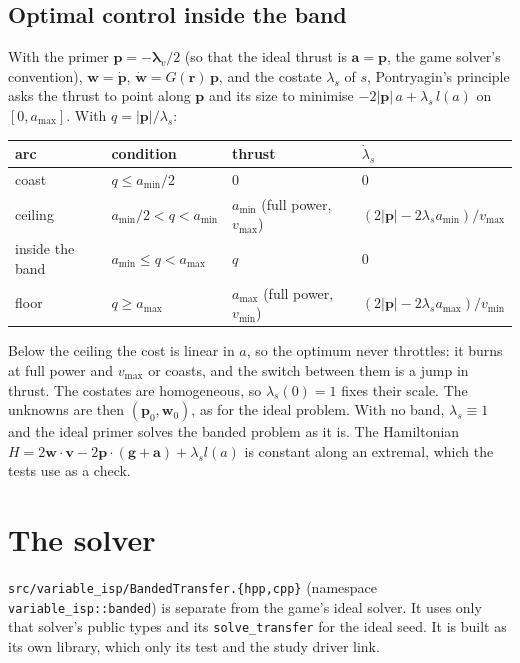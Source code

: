 \documentclass[10pt,a4paper]{article}
\begin{document}
\subsection{Optimal control inside the band}

With the primer $\mathbf p = -\boldsymbol\lambda_v/2$ (so that the ideal thrust is $\mathbf a = \mathbf p$, the game
solver's convention), $\mathbf w = \dot{\mathbf p}$, $\dot{\mathbf w} = G(\mathbf r)\,\mathbf p$, and the costate
$\lambda_s$ of $s$, Pontryagin's principle asks the thrust to point along $\mathbf p$ and its size to minimise
$-2|\mathbf p|\,a + \lambda_s\,l(a)$ on $[0, a_{\max}]$. With $q = |\mathbf p|/\lambda_s$:

\begin{center}
\begin{tabular}{llll}\toprule
arc & condition & thrust & $\dot\lambda_s$ \\ \midrule
coast & $q \le a_{\min}/2$ & $0$ & $0$ \\
ceiling & $a_{\min}/2 < q < a_{\min}$ & $a_{\min}$ (full power, $v_{\max}$) & $(2|\mathbf p| - 2\lambda_s a_{\min})/v_{\max}$ \\
inside the band & $a_{\min} \le q < a_{\max}$ & $q$ & $0$ \\
floor & $q \ge a_{\max}$ & $a_{\max}$ (full power, $v_{\min}$) & $(2|\mathbf p| - 2\lambda_s a_{\max})/v_{\min}$ \\
\bottomrule\end{tabular}
\end{center}

Below the ceiling the cost is linear in $a$, so the optimum never throttles: it burns at full power and $v_{\max}$
or coasts, and the switch between them is a jump in thrust. The costates are homogeneous, so $\lambda_s(0) = 1$
fixes their scale. The unknowns are then $(\mathbf p_0, \mathbf w_0)$, as for the ideal problem. With no band,
$\lambda_s \equiv 1$ and the ideal primer solves the banded problem as it is. The Hamiltonian
$H = 2\mathbf w\cdot\mathbf v - 2\mathbf p\cdot(\mathbf g + \mathbf a) + \lambda_s l(a)$ is constant along an
extremal, which the tests use as a check.

\section{The solver}

\texttt{src/variable\_isp/BandedTransfer.\{hpp,cpp\}} (namespace \texttt{variable\_isp::banded}) is separate from the
game's ideal solver. It uses only that solver's public types and its \texttt{solve\_transfer} for the ideal seed.
It is built as its own library, which only its test and the study driver link.
\end{document}
